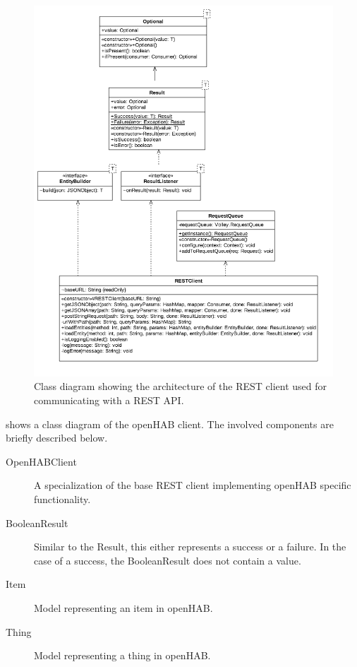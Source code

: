 \begin{figure}[h!]
\centering
\includegraphics[width=\textwidth]{images/uml-rest-client}
\caption{Class diagram showing the architecture of the REST client used for communicating with a REST API.}
\label{fig:design:communication-with-openhab:class-diagram-rest-client}
\end{figure}

 shows a class diagram of the openHAB client. The involved components are briefly described below.

\begin{description}
\item[OpenHABClient] A specialization of the base REST client implementing openHAB specific functionality.
\item[BooleanResult] Similar to the Result, this either represents a success or a failure. In the case of a success, the BooleanResult does not contain a value.
\item[Item] Model representing an item in openHAB.
\item[Thing] Model representing a thing in openHAB.
\end{description}

